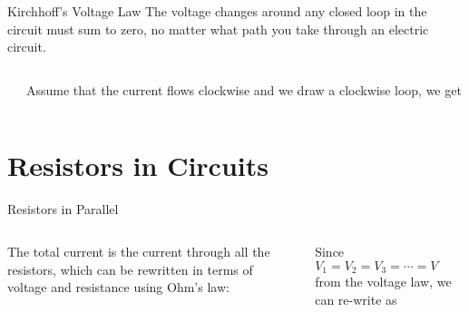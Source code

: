 \documentclass[12pt,aspectratio=169]{beamer}
\begin{document}
\begin{frame}{Kirchhoff's Voltage Law}
  The voltage changes around any closed loop in the circuit must sum to zero,
  no matter what path you take through an electric circuit.

  \vspace{.1in}
  \begin{columns}
    \begin{center}
    \end{center}
    Assume that the current flows clockwise and we draw a clockwise loop, we
    get

  \end{columns}
\end{frame}



\section{Resistors in Circuits}

\begin{frame}{Resistors in Parallel}
  \begin{columns}
    
    The total current is the current through all the resistors, which can be
    rewritten in terms of voltage and resistance using Ohm's law:

    
    Since $V_1=V_2=V_3=\cdots=V$ from the voltage law, we can re-write as

  \end{columns}
\end{frame}
\end{document}
